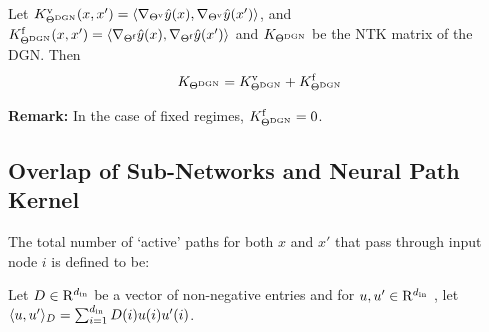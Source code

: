 \begin{proposition}\label{prop:ntks} Let $K^{\text{v}}_{\Theta^{\text{DGN}}}(x,x')=\langle  \nabla_{{\Theta}^{\text{v}}}\hat{y}(x), \nabla_{{\Theta}^{\text{v}}}\hat{y}(x')\rangle$, and  $K^{\text{f}}_{\Theta^{\text{DGN}}}(x,x')=\langle  \nabla_{\Theta^{\textrm{f}}}\hat{y}(x), \nabla_{\Theta^{\textrm{f}}}\hat{y}(x') \rangle$ and $K_{\Theta^{\text{DGN}}}$ be the NTK matrix of the DGN. Then 
\begin{align*}
K_{\Theta^{\text{DGN}}}=K^{\text{v}}_{\Theta^{\text{DGN}}}+K^{\text{f}}_{\Theta^{\text{DGN}}}
\end{align*}

\end{proposition}
\textbf{Remark:} In the case of fixed regimes, $K^{\text{f}}_{\Theta^{\text{DGN}}}=0$. 

\subsection{Overlap of Sub-Networks and Neural Path Kernel}

\begin{definition}\label{def:cnnlambda}
The total number of `active' paths for both $x$ and $x'$ that pass through input node $i$ is defined to be:\\
{}
\end{definition}
%
\begin{definition}
Let $D\in\mathrm{R}^{d_{\text{in}}}$ be a vector of non-negative entries  and for $u,u'\in\mathrm{R}^{d_{\text{in}}}$ , let $\langle u,u'\rangle_{D}=\sum_{i=1}^{d_{\text{in}}}D(i)u(i)u'(i)$. 
\end{definition}

